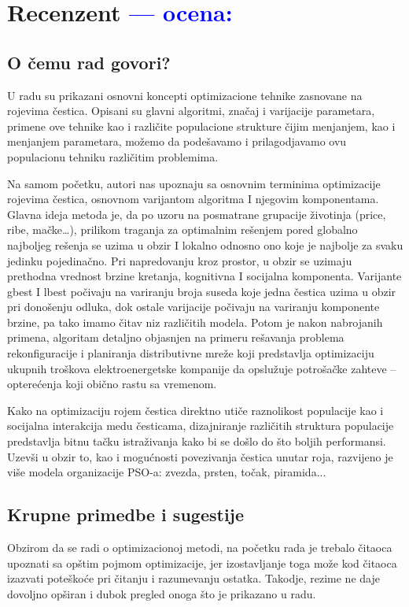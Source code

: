 \documentclass[a4paper]{report}
\newcommand{\odgovor}[1]{\textcolor{blue}{#1}}
\begin{document}
\chapter{Recenzent \odgovor{--- ocena:} }


\section{O čemu rad govori?}
{
U radu su prikazani osnovni koncepti optimizacione tehnike zasnovane na rojevima čestica. Opisani su glavni algoritmi, značaj i varijacije parametara, primene ove tehnike kao i različite populacione strukture čijim menjanjem, kao i menjanjem parametara, možemo da podešavamo i prilagodjavamo ovu populacionu tehniku različitim problemima.

Na samom početku, autori nas upoznaju sa osnovnim terminima optimizacije rojevima čestica, osnovnom varijantom algoritma I njegovim komponentama. Glavna ideja metoda je, da po uzoru na posmatrane grupacije životinja (price, ribe, mačke…), prilikom traganja za optimalnim rešenjem pored globalno najboljeg rešenja se uzima u obzir I lokalno odnosno ono koje je najbolje za svaku jedinku pojedinačno. Pri napredovanju kroz prostor, u obzir se uzimaju prethodna vrednost brzine kretanja, kognitivna I socijalna komponenta. Varijante gbest I lbest počivaju na variranju broja suseda koje jedna čestica uzima u obzir pri donošenju odluka, dok ostale varijacije počivaju na variranju komponente brzine, pa tako imamo čitav niz različitih modela.  Potom je nakon nabrojanih primena, algoritam detaljno objasnjen na primeru rešavanja problema rekonfiguracije i planiranja distributivne mreže  koji predstavlja optimizaciju ukupnih troškova elektroenergetske kompanije da opslužuje potrošačke zahteve – opterećenja koji obično rastu sa vremenom.

Kako na optimizaciju rojem čestica direktno utiče raznolikost populacije kao i socijalna interakcija medu česticama, dizajniranje različitih struktura populacije
predstavlja bitnu tačku istraživanja kako bi se došlo do što boljih performansi. Uzevši u obzir to, kao i mogućnosti povezivanja čestica unutar roja, razvijeno je više modela organizacije PSO-a: zvezda, prsten, točak, piramida... 
}

\section{Krupne primedbe i sugestije}
{ Obzirom da se radi o optimizacionoj metodi, na početku rada je trebalo čitaoca upoznati sa opštim pojmom optimizacije, jer izostavljanje toga može kod čitaoca izazvati poteškoće pri čitanju i razumevanju ostatka.}
{Takodje, rezime ne daje dovoljno opširan i dubok pregled onoga što je prikazano u radu. }
\end{document}
